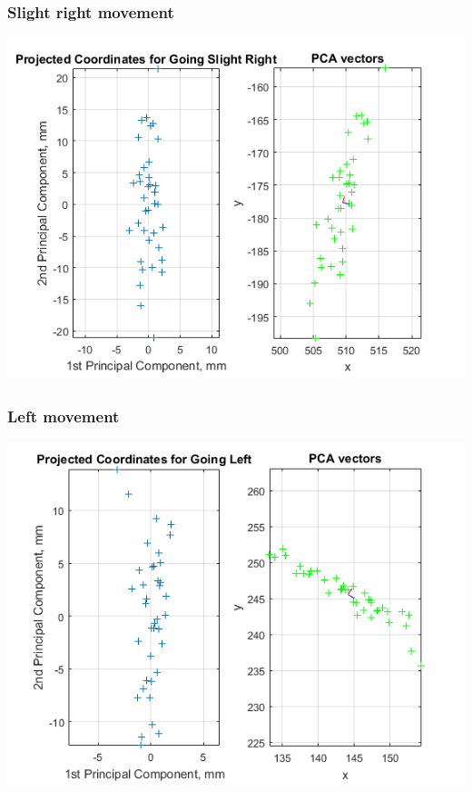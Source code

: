 \documentclass[a4paper, 12pt]{article}
\begin{document}
\subsubsection{Slight right movement}

\begin{center}
  \includegraphics[scale=0.8]{r1}
\end{center}


\subsubsection{Left movement}

\begin{center}
  \includegraphics[scale=0.8]{ll1}
\end{center}
\end{document}
